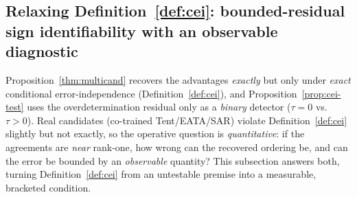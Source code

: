 
\subsection{Relaxing Definition~\ref{def:cei}: bounded-residual sign
identifiability with an observable diagnostic}\label{sec:multicand-residual}

Proposition~\ref{thm:multicand} recovers the advantages \emph{exactly} but only
under \emph{exact} conditional error-independence (Definition~\ref{def:cei}), and
Proposition~\ref{prop:cei-test} uses the overdetermination residual only as a
\emph{binary} detector ($\tau{=}0$ vs.\ $\tau{>}0$). Real candidates
(co-trained Tent/EATA/SAR) violate Definition~\ref{def:cei} slightly but not
exactly, so the operative question is \emph{quantitative}: if the agreements are
\emph{near} rank-one, how wrong can the recovered ordering be, and can the error
be bounded by an \emph{observable} quantity? This subsection answers both,
turning Definition~\ref{def:cei} from an untestable premise into a measurable,
bracketed condition.

